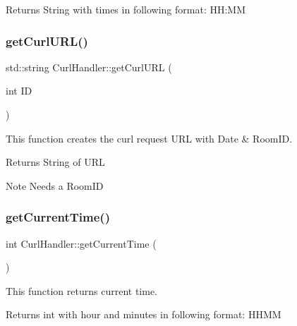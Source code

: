 \begin{DoxyReturn}{Returns}
String with times in following format\+: HH\+:MM 
\end{DoxyReturn}
\mbox{\label{classCurlHandler_a967784524e6d6d95b1d7089e3221fbfb}} 
\subsubsection{\texorpdfstring{get\+Curl\+U\+R\+L()}{getCurlURL()}}
{\footnotesize\ttfamily std\+::string Curl\+Handler\+::get\+Curl\+U\+RL (\begin{DoxyParamCaption}\item[{int}]{ID }\end{DoxyParamCaption})}



This function creates the curl request U\+RL with Date \& Room\+ID. 

\begin{DoxyReturn}{Returns}
String of U\+RL 
\end{DoxyReturn}
\begin{DoxyNote}{Note}
Needs a Room\+ID 
\end{DoxyNote}
\mbox{\label{classCurlHandler_a54e7bc698682a0b313b3de0f6d2c7cf4}} 
\subsubsection{\texorpdfstring{get\+Current\+Time()}{getCurrentTime()}}
{\footnotesize\ttfamily int Curl\+Handler\+::get\+Current\+Time (\begin{DoxyParamCaption}{ }\end{DoxyParamCaption})}



This function returns current time. 

\begin{DoxyReturn}{Returns}
int with hour and minutes in following format\+: H\+H\+MM 
\end{DoxyReturn}
\mbox{\label{classCurlHandler_af36e06319f16a97938bfb9a2ee8c0fa6}} 
